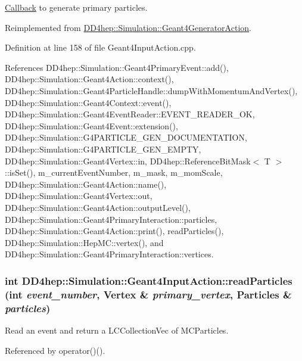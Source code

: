 \hyperlink{class_d_d4hep_1_1_callback}{Callback} to generate primary particles. 

Reimplemented from \hyperlink{class_d_d4hep_1_1_simulation_1_1_geant4_generator_action_ac5a1d2335a19e3f9d555081199e01801}{DD4hep::Simulation::Geant4GeneratorAction}.

Definition at line 158 of file Geant4InputAction.cpp.

References DD4hep::Simulation::Geant4PrimaryEvent::add(), DD4hep::Simulation::Geant4Action::context(), DD4hep::Simulation::Geant4ParticleHandle::dumpWithMomentumAndVertex(), DD4hep::Simulation::Geant4Context::event(), DD4hep::Simulation::Geant4EventReader::EVENT\_\-READER\_\-OK, DD4hep::Simulation::Geant4Event::extension(), DD4hep::Simulation::G4PARTICLE\_\-GEN\_\-DOCUMENTATION, DD4hep::Simulation::G4PARTICLE\_\-GEN\_\-EMPTY, DD4hep::Simulation::Geant4Vertex::in, DD4hep::ReferenceBitMask$<$ T $>$::isSet(), m\_\-currentEventNumber, m\_\-mask, m\_\-momScale, DD4hep::Simulation::Geant4Action::name(), DD4hep::Simulation::Geant4Vertex::out, DD4hep::Simulation::Geant4Action::outputLevel(), DD4hep::Simulation::Geant4PrimaryInteraction::particles, DD4hep::Simulation::Geant4Action::print(), readParticles(), DD4hep::Simulation::HepMC::vertex(), and DD4hep::Simulation::Geant4PrimaryInteraction::vertices.\hypertarget{class_d_d4hep_1_1_simulation_1_1_geant4_input_action_ad49c027669964d9a522eb60a6cffe4c4}{
\subsubsection[{readParticles}]{\setlength{\rightskip}{0pt plus 5cm}int DD4hep::Simulation::Geant4InputAction::readParticles (int {\em event\_\-number}, \/  {\bf Vertex} \& {\em primary\_\-vertex}, \/  {\bf Particles} \& {\em particles})}}
\label{class_d_d4hep_1_1_simulation_1_1_geant4_input_action_ad49c027669964d9a522eb60a6cffe4c4}


Read an event and return a LCCollectionVec of MCParticles. 

Referenced by operator()().

